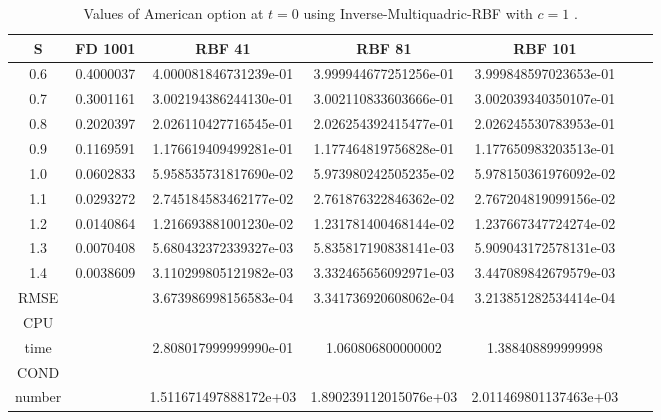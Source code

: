 \documentclass[12pt]{article}
\numberwithin{equation}{section} %
\begin{document}
\begin{table}[h]
\centering
\begin{tabular}{|c|c|c|c|c|c|c|}
  \hline
  S & FD 1001  & RBF 41 & RBF 81 & RBF 101 \\
  \hline
  0.6 & 0.4000037 &  4.000081846731239e-01 & 3.999944677251256e-01 & 3.999848597023653e-01 \\
  0.7 & 0.3001161  & 3.002194386244130e-01 & 3.002110833603666e-01 &3.002039340350107e-01 \\
  0.8 & 0.2020397  & 2.026110427716545e-01 & 2.026254392415477e-01 & 2.026245530783953e-01 \\
  0.9 & 0.1169591  & 1.176619409499281e-01 &  1.177464819756828e-01 &  1.177650983203513e-01\\
  1.0 & 0.0602833  & 5.958535731817690e-02 & 5.973980242505235e-02 &  5.978150361976092e-02\\
  1.1 & 0.0293272  & 2.745184583462177e-02 & 2.761876322846362e-02 &   2.767204819099156e-02\\
  1.2 & 0.0140864  &  1.216693881001230e-02 &  1.231781400468144e-02  & 1.237667347724274e-02 \\
  1.3 & 0.0070408  &  5.680432372339327e-03 & 5.835817190838141e-03 & 5.909043172578131e-03 \\
  1.4 & 0.0038609  & 3.110299805121982e-03 &  3.332465656092971e-03&  3.447089842679579e-03\\
  \hline
  RMSE &   & 3.673986998156583e-04 &3.341736920608062e-04 & 3.213851282534414e-04\\
  \hline
  CPU &   &  &  &  \\
  time  &   &  2.808017999999990e-01 & 1.060806800000002 & 1.388408899999998 \\
  \hline
   COND &   &  &  &  \\
  number  &   & 1.511671497888172e+03 &  1.890239112015076e+03 & 2.011469801137463e+03 \\
  \hline
\end{tabular}
  \caption{Values of American option at $t=0$ using Inverse-Multiquadric-RBF with $c=1$ .}\label{Tab_1DFinal}
\end{table}
\end{document}
